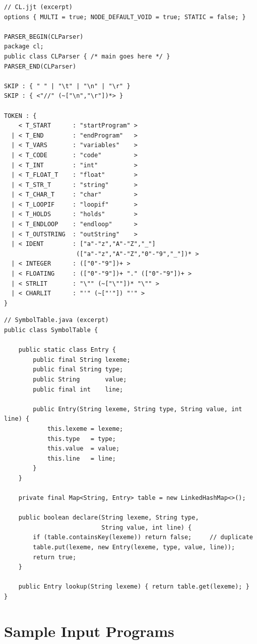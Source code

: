 \documentclass[12pt,a4paper]{report}
\begin{document}
\begin{verbatim}
// CL.jjt (excerpt)
options { MULTI = true; NODE_DEFAULT_VOID = true; STATIC = false; }

PARSER_BEGIN(CLParser)
package cl;
public class CLParser { /* main goes here */ }
PARSER_END(CLParser)

SKIP : { " " | "\t" | "\n" | "\r" }
SKIP : { <"//" (~["\n","\r"])*> }

TOKEN : {
    < T_START      : "startProgram" >
  | < T_END        : "endProgram"   >
  | < T_VARS       : "variables"    >
  | < T_CODE       : "code"         >
  | < T_INT        : "int"          >
  | < T_FLOAT_T    : "float"        >
  | < T_STR_T      : "string"       >
  | < T_CHAR_T     : "char"         >
  | < T_LOOPIF     : "loopif"       >
  | < T_HOLDS      : "holds"        >
  | < T_ENDLOOP    : "endloop"      >
  | < T_OUTSTRING  : "outString"    >
  | < IDENT        : ["a"-"z","A"-"Z","_"]
                    (["a"-"z","A"-"Z","0"-"9","_"])* >
  | < INTEGER      : (["0"-"9"])+ >
  | < FLOATING     : (["0"-"9"])+ "." (["0"-"9"])+ >
  | < STRLIT       : "\"" (~["\""])* "\"" >
  | < CHARLIT      : "'" (~["'"]) "'" >
}
\end{verbatim}

\begin{verbatim}
// SymbolTable.java (excerpt)
public class SymbolTable {

    public static class Entry {
        public final String lexeme;
        public final String type;
        public String       value;
        public final int    line;

        public Entry(String lexeme, String type, String value, int line) {
            this.lexeme = lexeme;
            this.type   = type;
            this.value  = value;
            this.line   = line;
        }
    }

    private final Map<String, Entry> table = new LinkedHashMap<>();

    public boolean declare(String lexeme, String type,
                           String value, int line) {
        if (table.containsKey(lexeme)) return false;     // duplicate
        table.put(lexeme, new Entry(lexeme, type, value, line));
        return true;
    }

    public Entry lookup(String lexeme) { return table.get(lexeme); }
}
\end{verbatim}

\chapter{Sample Input Programs}
\end{document}
